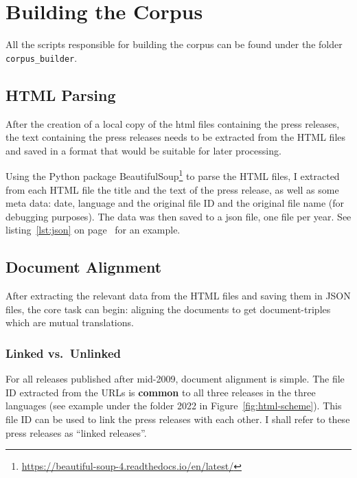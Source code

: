 \section{Building the Corpus}
All the scripts responsible for building the corpus can be found under the folder \texttt{corpus\_builder}.

\subsection{HTML Parsing}
After the creation of a local copy of the \acrshort{html} files containing the press releases, the text containing the press releases needs to be extracted from the HTML files and saved in a format that would be suitable for later processing.

Using the Python package BeautifulSoup\footnote{\url{https://beautiful-soup-4.readthedocs.io/en/latest/}} to parse the HTML files, I extracted from each HTML file the title and the text of the press release, as well as some meta data: date, language and the original file ID and the original file name (for debugging purposes).  
The data was then saved to a \gls{json}\footnotemark{} file, one file per year.
See listing~\ref{lst:json} on page~\pageref{lst:json} for an example.




\subsection{Document Alignment}
After extracting the relevant data from the HTML files and saving them in \acrshort{JSON} files, the core task can begin: aligning the documents to get document-triples which are mutual translations.

\subsubsection{Linked vs.~Unlinked}
\label{sec:linked-unlinked}
For all releases published after mid-2009, document alignment is simple. 
The file ID extracted from the URLs is \textbf{common} to all three releases in the three languages (see example under the folder 2022 in Figure~\ref{fig:html-scheme}). 
This file ID can be used to link the press releases with each other. 
I shall refer to these press releases as \enquote{linked releases}.

